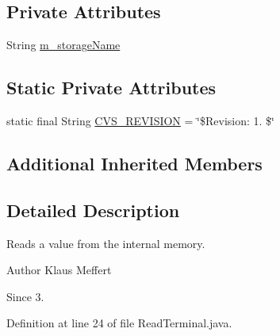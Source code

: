 \subsection*{Private Attributes}
\begin{DoxyCompactItemize}
\item 
String \hyperlink{classorg_1_1jgap_1_1gp_1_1function_1_1_read_terminal_a4d070693575ea13b1de97b361253cf6e}{m\-\_\-storage\-Name}
\end{DoxyCompactItemize}
\subsection*{Static Private Attributes}
\begin{DoxyCompactItemize}
\item 
static final String \hyperlink{classorg_1_1jgap_1_1gp_1_1function_1_1_read_terminal_ab216e6139a18cba4424897dcb506335a}{C\-V\-S\-\_\-\-R\-E\-V\-I\-S\-I\-O\-N} = \char`\"{}\$Revision\-: 1. \$\char`\"{}
\end{DoxyCompactItemize}
\subsection*{Additional Inherited Members}


\subsection{Detailed Description}
Reads a value from the internal memory.

\begin{DoxyAuthor}{Author}
Klaus Meffert 
\end{DoxyAuthor}
\begin{DoxySince}{Since}
3. 
\end{DoxySince}


Definition at line 24 of file Read\-Terminal.\-java.



